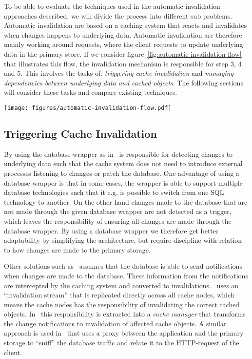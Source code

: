 To be able to evaluate the techniques used in the automatic invalidation approaches described, we will divide the process into different sub problems. Automatic invalidation are based on a caching system that reacts and invalidates when changes happens to underlying data. Automatic invalidation are therefore mainly working around requests, where the client requests to update underlying data in the primary store. If we consider figure~\ref{fig:automatic-invalidation-flow} that illustrates this flow, the invalidation mechanism is responsible for step 3, 4 and 5. This involves the tasks of: \emph{triggering cache invalidation} and \emph{managing dependencies between underlying data and cached objects}. The following sections will consider these tasks and compare existing techniques.

\begin{figure*}[ht!]
  \centering
  \texttt{[image: figures/automatic-invalidation-flow.pdf]}
  \caption{The control flow of automatic invalidation when a client requests to update underlying data}
  \label{fig:automatic-invalidation-flow}
\end{figure*}

\subsection{Triggering Cache Invalidation}
\label{subsubsec:triggering-cache-invalidation}

By using the database wrapper as in~\cite{paper:cache-genie, paper:deploy-time} is responsible for detecting changes to underlying data such that the cache system does not need to introduce external processes listening to changes or patch the database. One advantage of using a database wrapper is that in some cases, the wrapper is able to support multiple database technologies such that it e.g. is possible to switch from one SQL technology to another. On the other hand changes made to the database that are not made through the given database wrapper are not detected as a trigger, which leaves the responsibility of ensuring all changes are made through the database wrapper. By using a database wrapper we therefore get better adaptability by simplifying the architecture, but require discipline with relation to how changes are made to the primary storage.

Other solutions such as~\cite{paper:liskov, paper:ibm, paper:ibm-extended} assumes that the database is able to send notifications when changes are made to the database. These information from the notifications are intercepted by the caching system and converted to invalidations.~\cite{paper:liskov} uses an ``invalidation stream'' that is replicated directly across all cache nodes, which means the cache nodes has the responsibility of invalidating the correct cached objects. In~\cite{paper:ibm, paper:ibm-extended} this responsibility is extracted into a \emph{cache manager} that transforms the change notifications to invalidation of affected cache objects. A similar approach is used in~\cite{paper:db-driven-http} that uses a proxy between the application and the primary storage to ``sniff'' the database traffic and relate it to the HTTP-request of the client.


